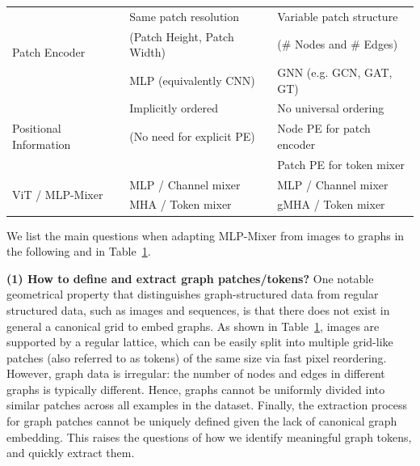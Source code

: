 \documentclass{article}
\begin{document}
\begin{table}[t]
\begin{tabular}{lll}
        \midrule
        \multirow{3}{*}{Patch Encoder}
        & Same patch resolution  & Variable patch structure \\
        & \quad (Patch Height, Patch Width)  & \quad (\# Nodes and \# Edges) \\
        & MLP (equivalently CNN) & GNN (e.g. GCN, GAT, GT) \\
        
        \midrule
        \multirow{3}{*}{Positional Information }
        & Implicitly ordered & No universal ordering\\
        & \quad (No need for explicit PE) & %
        {Node PE for patch encoder} \\
        & & %
        {Patch PE for token mixer} \\
        
        \midrule
        \multirow{2}{*}{ViT / MLP-Mixer} 
        & MLP / Channel mixer
        & MLP / Channel mixer\\
         & MHA / Token mixer  & %
         gMHA / Token mixer
        \\\bottomrule
    \end{tabular}
    \label{tab: comparision}
\end{table}

We list the main questions when adapting MLP-Mixer from images to graphs in the following and in Table~\ref{tab: comparision}. 

\textbf{(1) How to define and extract graph patches/tokens?} One notable geometrical property that distinguishes graph-structured data from regular structured data, such as images and sequences, is that there does not exist in general a canonical grid to embed graphs. As shown in Table~\ref{tab: comparision}, images are supported by a regular lattice, which can be easily split into multiple grid-like patches (also referred to as tokens) of the same size via fast pixel reordering. However, graph data is irregular: the number of nodes and edges in different graphs is typically different. Hence, graphs cannot be uniformly divided into similar patches across all examples in the dataset. Finally, the extraction process for graph patches cannot be uniquely defined given the lack of canonical graph embedding. This raises the questions of how we identify meaningful graph tokens, and quickly extract them.
\end{document}
